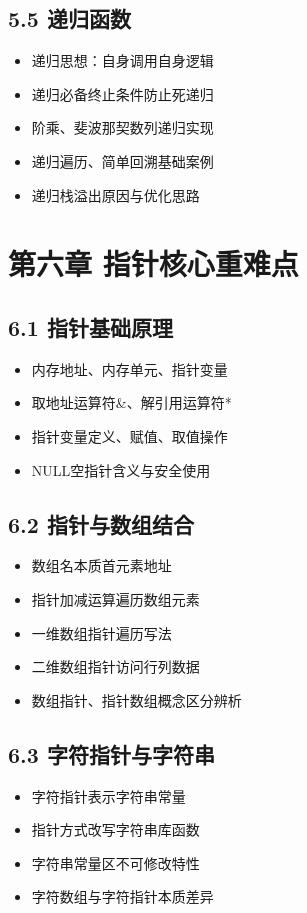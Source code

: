 \subsection{5.5 递归函数}
\begin{itemize}
\item 递归思想：自身调用自身逻辑
\item 递归必备终止条件防止死递归
\item 阶乘、斐波那契数列递归实现
\item 递归遍历、简单回溯基础案例
\item 递归栈溢出原因与优化思路
\end{itemize}

\section{第六章 指针核心重难点}
\subsection{6.1 指针基础原理}
\begin{itemize}
\item 内存地址、内存单元、指针变量
\item 取地址运算符\&、解引用运算符*
\item 指针变量定义、赋值、取值操作
\item NULL空指针含义与安全使用
\end{itemize}

\subsection{6.2 指针与数组结合}
\begin{itemize}
\item 数组名本质首元素地址
\item 指针加减运算遍历数组元素
\item 一维数组指针遍历写法
\item 二维数组指针访问行列数据
\item 数组指针、指针数组概念区分辨析
\end{itemize}

\subsection{6.3 字符指针与字符串}
\begin{itemize}
\item 字符指针表示字符串常量
\item 指针方式改写字符串库函数
\item 字符串常量区不可修改特性
\item 字符数组与字符指针本质差异
\end{itemize}

